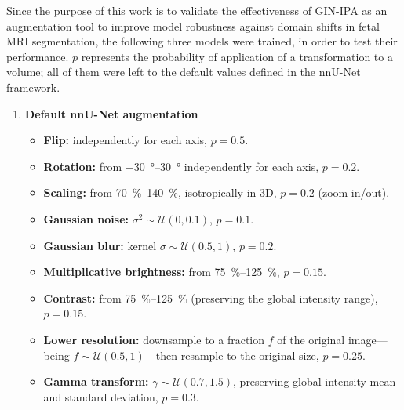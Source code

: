 Since the purpose of this work is to validate the effectiveness of GIN-IPA as an augmentation tool to improve model robustness against domain shifts in fetal MRI segmentation, the following three models were trained, in order to test their performance. $p$ represents the probability of application of a transformation to a volume; all of them were left to the default values defined in the nnU-Net framework.
\begin{enumerate}

    \item \textbf{Default nnU-Net augmentation}
    \begin{itemize}
        \item \textbf{Flip:} independently for each axis, $p=0.5$.
        \item \textbf{Rotation:} from \qtyrange{-30}{30}{\degree} independently for each axis, $p=0.2$.
        \item \textbf{Scaling:} from \qtyrange{70}{140}{\percent}, isotropically in 3D, $p=0.2$ (zoom in/out).
        \item \textbf{Gaussian noise:} $\sigma^2 \sim \mathcal{U}(0, 0.1)$, $p=0.1$.
        \item \textbf{Gaussian blur:} kernel $\sigma \sim \mathcal{U}(0.5, 1)$, $p=0.2$.
        \item \textbf{Multiplicative brightness:} from \qtyrange{75}{125}{\percent}, $p=0.15$.
        \item \textbf{Contrast:} from \qtyrange{75}{125}{\percent} (preserving the global intensity range), $p=0.15$.
        \item \textbf{Lower resolution:} downsample to a fraction $f$ of the original image---being $f \sim \mathcal{U}(0.5, 1)$---then resample to the original size, $p=0.25$.
        \item \textbf{Gamma transform:} $\gamma \sim \mathcal{U}(0.7, 1.5)$, preserving global intensity mean and standard deviation, $p=0.3$.
    \end{itemize}


\end{enumerate}
